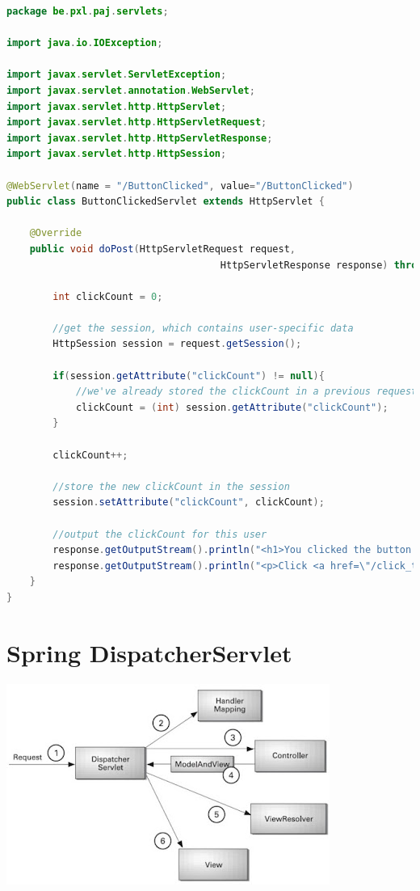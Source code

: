 \begin{lstlisting}[language=java, frame=single]
package be.pxl.paj.servlets;

import java.io.IOException;

import javax.servlet.ServletException;
import javax.servlet.annotation.WebServlet;
import javax.servlet.http.HttpServlet;
import javax.servlet.http.HttpServletRequest;
import javax.servlet.http.HttpServletResponse;
import javax.servlet.http.HttpSession;

@WebServlet(name = "/ButtonClicked", value="/ButtonClicked")
public class ButtonClickedServlet extends HttpServlet {

	@Override
	public void doPost(HttpServletRequest request, 
	                                 HttpServletResponse response) throws IOException, ServletException {

		int clickCount = 0;

		//get the session, which contains user-specific data
		HttpSession session = request.getSession();

		if(session.getAttribute("clickCount") != null){
			//we've already stored the clickCount in a previous request, so get it
			clickCount = (int) session.getAttribute("clickCount");
		}

		clickCount++;

		//store the new clickCount in the session
		session.setAttribute("clickCount", clickCount);

		//output the clickCount for this user
		response.getOutputStream().println("<h1>You clicked the button " + clickCount + " times.</h1>");
		response.getOutputStream().println("<p>Click <a href=\"/click_the_button.html\">here</a> to go back to the button.</p>");
	}
}
\end{lstlisting}


\section{Spring DispatcherServlet}


\includegraphics{./images/chapter8/spring_mvc}

